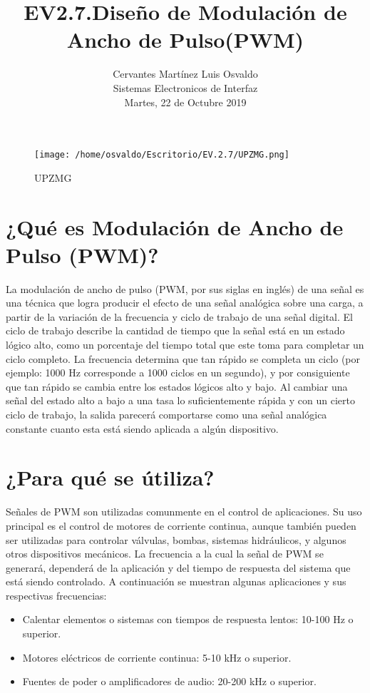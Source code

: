 \documentclass[11pt]{article}
\title{\textbf{EV2.7.Dise\~no de Modulaci\'on de Ancho de Pulso(PWM)}}
\author{Cervantes Mart\'inez Luis Osvaldo\\
		Sistemas Electronicos de Interfaz\\
		Martes, 22 de Octubre 2019}
\date{}
\begin{document}
\maketitle
\begin{figure}[htp]
\centering
\texttt{[image: /home/osvaldo/Escritorio/EV.2.7/UPZMG.png]}
\caption{UPZMG}
\label{}
\end{figure}

\pagebreak
\section{¿Qu\'e es Modulaci\'on de Ancho de Pulso (PWM)?}
La modulaci\'on de ancho de pulso (PWM, por sus siglas en ingl\'es) de una se\~nal es una t\'ecnica que logra producir el efecto de una se\~nal anal\'ogica sobre una carga, a partir de la variaci\'on de la frecuencia y ciclo de trabajo de una se\~nal digital. El ciclo de trabajo describe la cantidad de tiempo que la se\~nal est\'a en un estado l\'ogico alto, como un porcentaje del tiempo total que este toma para completar un ciclo completo. La frecuencia determina que tan r\'apido se completa un ciclo (por ejemplo: 1000 Hz corresponde a 1000 ciclos en un segundo), y por consiguiente que tan r\'apido se cambia entre los estados l\'ogicos alto y bajo. Al cambiar una se\~nal del estado alto a bajo a una tasa lo suficientemente r\'apida y con un cierto ciclo de trabajo, la salida parecer\'a comportarse como una se\~nal anal\'ogica constante cuanto esta est\'a siendo aplicada a alg\'un dispositivo.

\section{¿Para qu\'e se \'utiliza?}
Se\~nales de PWM son utilizadas comunmente en el control de aplicaciones. Su uso principal es el control de motores de corriente continua, aunque tambi\'en pueden ser utilizadas para controlar v\'alvulas, bombas, sistemas hidr\'aulicos, y algunos otros dispositivos mec\'anicos. La frecuencia a la cual la se\~nal de PWM se generar\'a, depender\'a de la aplicaci\'on y del tiempo de respuesta del sistema que est\'a siendo controlado. A continuaci\'on se muestran algunas aplicaciones y sus respectivas frecuencias:
\begin{itemize}
\item Calentar elementos o sistemas con tiempos de respuesta lentos: 10-100 Hz o superior.            
\item Motores eléctricos de corriente continua: 5-10 kHz o superior.
\item Fuentes de poder o amplificadores de audio: 20-200 kHz o superior.
\end{itemize}
\end{document}
